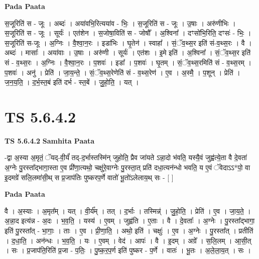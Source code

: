 \documentclass[17pt]{extarticle}
\begin{document}
\textbf{Pada Paata} \newline

स॒जूरिति॑ स - जूः । अब्दः॑ । अया॑वभि॒रित्यया॑व - भिः॒ । स॒जूरिति॑ स - जूः । उ॒षाः । अरु॑णीभिः । स॒जूरिति॑ स - जूः । सूर्यः॑ । एत॑शेन । स॒जोषा॒विति॑ स - जोषौ᳚ । अ॒श्विना᳚ । दꣳसो॑भि॒रिति॒ दꣳसः॑ - भिः॒ । स॒जूरिति॑ स-जूः । अ॒ग्निः । वै॒श्वा॒न॒रः । इडा॑भिः । घृ॒तेन॑ । स्वाहा᳚ । सं॒ॅव॒थ्स॒र इति॑ सं-व॒थ्स॒रः । वै । अब्दः॑ । मासाः᳚ । अया॑वाः । उ॒षाः । अरु॑णी । सूर्यः॑ । एत॑शः । इ॒मे इति॑ । अ॒श्विना᳚ । सं॒ॅव॒थ्स॒र इति॑ सं - व॒थ्स॒रः । अ॒ग्निः । वै॒श्वा॒न॒रः । प॒शवः॑ । इडा᳚ । प॒शवः॑ । घृ॒तम् । सं॒ॅव॒थ्स॒रमिति॑ सं - व॒थ्स॒रम् । प॒शवः॑ । अनु॑ । प्रेति॑ । जा॒य॒न्ते॒ । सं॒ॅव॒थ्स॒रेणेति॑ सं - व॒थ्स॒रेण॑ । ए॒व । अ॒स्मै॒ । प॒शून् । प्रेति॑ । ज॒न॒य॒ति॒ । द॒र्भ॒स्त॒बं इति॑ दर्भ - स्त॒बें । जु॒हो॒ति॒ । यत् ।  \newline





\section{ TS 5.6.4.2 }

\textbf{TS 5.6.4.2 } \newline
\textbf{Samhita Paata} \newline

-द्वा अ॒स्या अ॒मृतं॒ ॅयद्-वी॒र्यं॑ तद्-द॒र्भास्तस्मि॑न् जुहोति॒ प्रैव जा॑यते ऽन्ना॒दो भ॑वति॒ यस्यै॒वं जुह्व॑त्ये॒ता वै दे॒वता॑ अ॒ग्नेः पु॒रस्ता᳚द्भागा॒स्ता ए॒व प्री॑णा॒त्यथो॒ चक्षु॑रे॒वाग्नेः पु॒रस्ता॒त् प्रति॑ दधा॒त्यन॑न्धो भवति॒ य ए॒वं ॅवेदाऽऽ*पो॒ वा इ॒दमग्रे॑ सलि॒लमा॑सी॒थ् स प्र॒जाप॑तिः पुष्करप॒र्णे वातो॑ भू॒तो॑ऽलेलाय॒थ् सः - [  ] \newline

\textbf{Pada Paata} \newline

वै । अ॒स्याः । अ॒मृत᳚म् । यत् । वी॒र्य᳚म् । तत् । द॒र्भाः । तस्मिन्न्॑ । जु॒हो॒ति॒ । प्रेति॑ । ए॒व । जा॒य॒ते॒ । अ॒न्ना॒द इत्य॑न्न - अ॒दः । भ॒व॒ति॒ । यस्य॑ । ए॒वम् । जुह्व॑ति । ए॒ताः । वै । दे॒वताः᳚ । अ॒ग्नेः । पु॒रस्ता᳚द्भागा॒ इति॑ पु॒रस्ता᳚त् - भा॒गाः॒ । ताः । ए॒व । प्री॒णा॒ति॒ । अथो॒ इति॑ । चक्षुः॑ । ए॒व । अ॒ग्नेः । पु॒रस्ता᳚त् । प्रतीति॑ । द॒धा॒ति॒ । अन॑न्धः । भ॒व॒ति॒ । यः । ए॒वम् । वेद॑ । आपः॑ । वै । इ॒दम् । अग्रे᳚ । स॒लि॒लम् । आ॒सी॒त् । सः । प्र॒जाप॑ति॒रिति॑ प्र॒जा - प॒तिः॒ । पु॒ष्क॒र॒प॒र्ण इति॑ पुष्कर - प॒र्णे । वातः॑ । भू॒तः । अ॒ले॒ला॒य॒त् । सः ।  \newline
\end{document}
